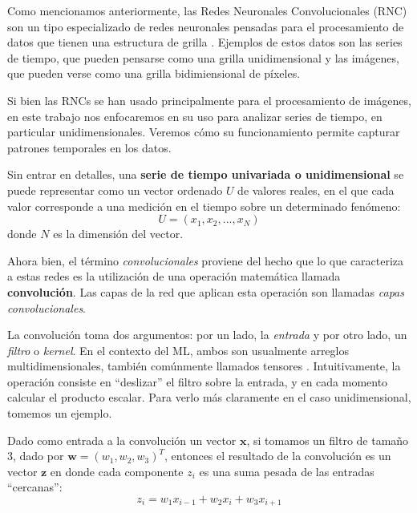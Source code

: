 \documentclass[../../main.tex]{subfiles}
\begin{document}

Como mencionamos anteriormente, las Redes Neuronales Convolucionales (RNC) son un tipo
especializado de redes neuronales pensadas para el procesamiento de datos que tienen una
estructura de grilla \cite{deep-learning}. Ejemplos de estos datos son las series de
tiempo, que pueden pensarse como una grilla unidimensional y las imágenes, que pueden
verse como una grilla bidimiensional de píxeles.

Si bien las RNCs se han usado principalmente para el procesamiento de imágenes, en este
trabajo nos enfocaremos en su uso para analizar series de tiempo, en particular
unidimensionales. Veremos cómo su funcionamiento permite capturar patrones temporales en
los datos.

Sin entrar en detalles\footnotemark, una \textbf{serie de tiempo univariada o
unidimensional} se puede representar como un vector ordenado \(U\) de valores reales, en
el que cada valor corresponde a una medición en el tiempo sobre un determinado fenómeno:
\[
    U = (x_1, x_2, ..., x_N)
\]
donde \(N\) es la dimensión del vector.

Ahora bien, el término \textit{convolucionales} proviene del hecho que lo que caracteriza
a estas redes es la utilización de una operación matemática llamada
\textbf{convolución}\footnotemark \cite{deep-learning}. Las capas de la red que aplican
esta operación son llamadas \textit{capas convolucionales}. 

La convolución toma dos argumentos: por un lado, la \textit{entrada} y por otro lado, un
\textit{filtro} o \textit{kernel}. En el contexto del ML, ambos son usualmente arreglos
multidimensionales, también comúnmente llamados tensores \cite{deep-learning}.
Intuitivamente, la operación consiste en ``deslizar'' el filtro sobre la entrada, y en
cada momento calcular el producto escalar. Para verlo más claramente en el caso
unidimensional, tomemos un ejemplo.

Dado como entrada a la convolución un vector \(\mathbf{x}\), si tomamos un filtro de
tamaño 3, dado por \(\bm{w}=(w_1, w_2, w_3)^T\), entonces el resultado de la convolución
es un vector \(\mathbf{z}\) en donde cada componente \(z_i\) es una suma pesada de las
entradas ``cercanas'':
\[z_i = w_1 x_{i-1} + w_2 x_{i} + w_3 x_{i+1}\]
\end{document}
